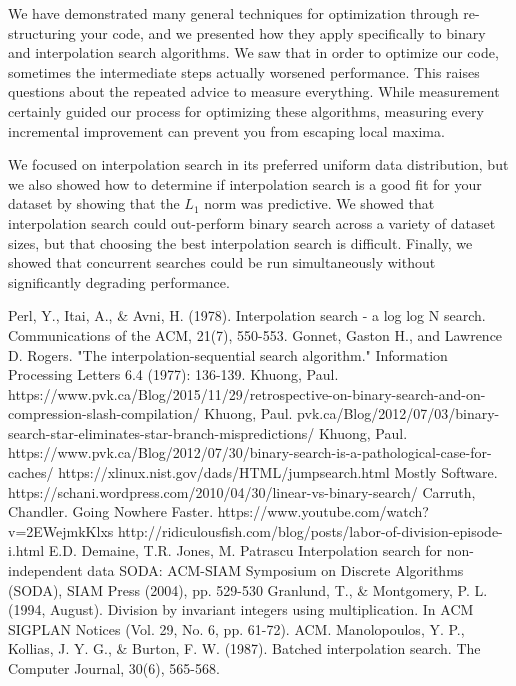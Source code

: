 \documentclass[twocolumn]{article}
\begin{document}
We have demonstrated many general techniques for optimization through re-structuring your code, and we presented how they apply specifically to binary and interpolation search algorithms. We saw that in order to optimize our code, sometimes the intermediate steps actually worsened performance. This raises questions about the repeated advice to measure everything. While measurement certainly guided our process for optimizing these algorithms, measuring every incremental improvement can prevent you from escaping local maxima.

We focused on interpolation search in its preferred uniform data distribution, but we also showed how to determine if interpolation search is a good fit for your dataset by showing that the $L_1$ norm was predictive. We showed that interpolation search could out-perform binary search across a variety of dataset sizes, but that choosing the best interpolation search is difficult. Finally, we showed that concurrent searches could be run simultaneously without significantly degrading performance.

\onecolumn
\begin{thebibliography}{1}
   Perl, Y., Itai, A., \& Avni, H. (1978). Interpolation search - a log log N search. Communications of the ACM, 21(7), 550-553.
   Gonnet, Gaston H., and Lawrence D. Rogers. "The interpolation-sequential search algorithm." Information Processing Letters 6.4 (1977): 136-139.
 Khuong, Paul. https://www.pvk.ca/Blog/2015/11/29/retrospective-on-binary-search-and-on-compression-slash-compilation/
 Khuong, Paul. pvk.ca/Blog/2012/07/03/binary-search-star-eliminates-star-branch-mispredictions/
 Khuong, Paul. https://www.pvk.ca/Blog/2012/07/30/binary-search-is-a-pathological-case-for-caches/
 https://xlinux.nist.gov/dads/HTML/jumpsearch.html
 Mostly Software. https://schani.wordpress.com/2010/04/30/linear-vs-binary-search/
 Carruth, Chandler. Going Nowhere Faster. https://www.youtube.com/watch?v=2EWejmkKlxs
 http://ridiculousfish.com/blog/posts/labor-of-division-episode-i.html
 E.D. Demaine, T.R. Jones, M. Patrascu Interpolation search for non-independent data SODA: ACM-SIAM Symposium on Discrete Algorithms (SODA), SIAM Press (2004), pp. 529-530
 Granlund, T., \& Montgomery, P. L. (1994, August). Division by invariant integers using multiplication. In ACM SIGPLAN Notices (Vol. 29, No. 6, pp. 61-72). ACM.
 Manolopoulos, Y. P., Kollias, J. Y. G., \& Burton, F. W. (1987). Batched interpolation search. The Computer Journal, 30(6), 565-568.
\end{thebibliography}
\end{document}
